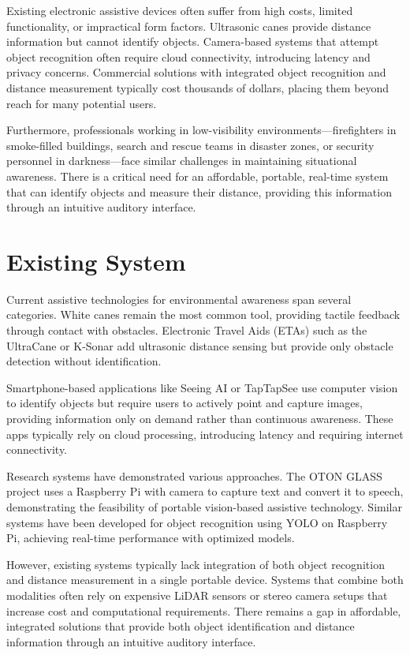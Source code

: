 \documentclass[conference]{IEEEtran}
\begin{document}
Existing electronic assistive devices often suffer from high costs, limited functionality, or impractical form factors. Ultrasonic canes provide distance information but cannot identify objects. Camera-based systems that attempt object recognition often require cloud connectivity, introducing latency and privacy concerns. Commercial solutions with integrated object recognition and distance measurement typically cost thousands of dollars, placing them beyond reach for many potential users.

Furthermore, professionals working in low-visibility environments—firefighters in smoke-filled buildings, search and rescue teams in disaster zones, or security personnel in darkness—face similar challenges in maintaining situational awareness. There is a critical need for an affordable, portable, real-time system that can identify objects and measure their distance, providing this information through an intuitive auditory interface.

\section{Existing System}
Current assistive technologies for environmental awareness span several categories. White canes remain the most common tool, providing tactile feedback through contact with obstacles. Electronic Travel Aids (ETAs) such as the UltraCane or K-Sonar add ultrasonic distance sensing but provide only obstacle detection without identification.

Smartphone-based applications like Seeing AI or TapTapSee use computer vision to identify objects but require users to actively point and capture images, providing information only on demand rather than continuous awareness. These apps typically rely on cloud processing, introducing latency and requiring internet connectivity.

Research systems have demonstrated various approaches. The OTON GLASS project uses a Raspberry Pi with camera to capture text and convert it to speech, demonstrating the feasibility of portable vision-based assistive technology. Similar systems have been developed for object recognition using YOLO on Raspberry Pi, achieving real-time performance with optimized models.

However, existing systems typically lack integration of both object recognition and distance measurement in a single portable device. Systems that combine both modalities often rely on expensive LiDAR sensors or stereo camera setups that increase cost and computational requirements. There remains a gap in affordable, integrated solutions that provide both object identification and distance information through an intuitive auditory interface.
\end{document}
